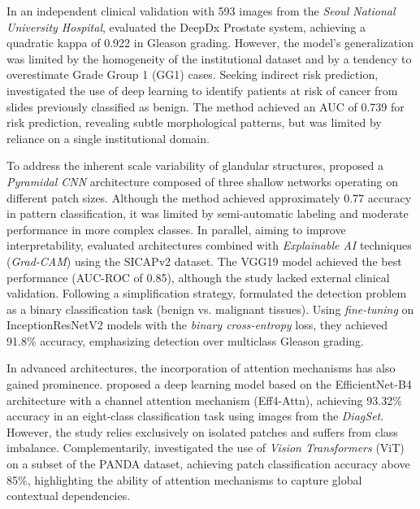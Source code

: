 In an independent clinical validation with 593 images from the \textit{Seoul National University Hospital}, \cite{jung2022artificial} evaluated the DeepDx Prostate system, achieving a quadratic kappa of 0.922 in Gleason grading. However, the model's generalization was limited by the homogeneity of the institutional dataset and by a tendency to overestimate Grade Group 1 (GG1) cases. Seeking indirect risk prediction, \cite{liu2022deep} investigated the use of deep learning to identify patients at risk of cancer from slides previously classified as benign. The method achieved an AUC of 0.739 for risk prediction, revealing subtle morphological patterns, but was limited by reliance on a single institutional domain.

To address the inherent scale variability of glandular structures, \cite{pyramidalcnn} proposed a \textit{Pyramidal CNN} architecture composed of three shallow networks operating on different patch sizes. Although the method achieved approximately 0.77 accuracy in pattern classification, it was limited by semi-automatic labeling and moderate performance in more complex classes. In parallel, aiming to improve interpretability, \cite{kosoko2024xai_prostate} evaluated architectures combined with \textit{Explainable AI} techniques (\textit{Grad-CAM}) using the SICAPv2 dataset. The VGG19 model achieved the best performance (AUC-ROC of 0.85), although the study lacked external clinical validation. Following a simplification strategy, \cite{afifi2024prostate} formulated the detection problem as a binary classification task (benign vs. malignant tissues). Using \textit{fine-tuning} on InceptionResNetV2 models with the \textit{binary cross-entropy} loss, they achieved 91.8\% accuracy, emphasizing detection over multiclass Gleason grading.

In advanced architectures, the incorporation of attention mechanisms has also gained prominence. \cite{alici2024efficient} proposed a deep learning model based on the EfficientNet-B4 architecture with a channel attention mechanism (Eff4-Attn), achieving 93.32\% accuracy in an eight-class classification task using images from the \textit{DiagSet}. However, the study relies exclusively on isolated patches and suffers from class imbalance. Complementarily, \cite{ikromjanov2021vit_prostate} investigated the use of \textit{Vision Transformers} (ViT) on a subset of the PANDA dataset, achieving patch classification accuracy above 85\%, highlighting the ability of attention mechanisms to capture global contextual dependencies.

